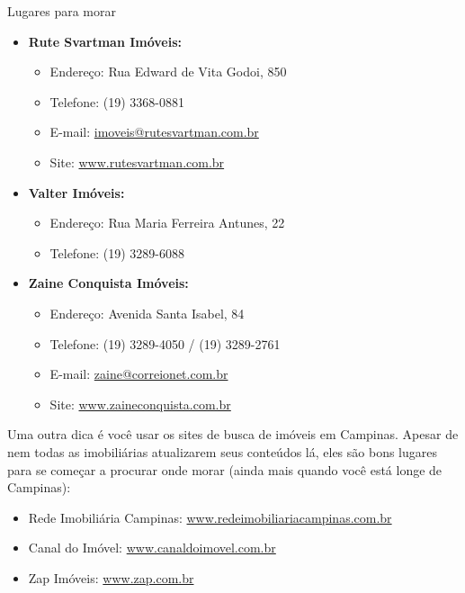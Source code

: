 \begin{story}{Lugares para morar}
\begin{itemize}
\item \textbf{Rute Svartman Imóveis:}
\begin{itemize}
\item Endereço: Rua Edward de Vita Godoi, 850
\item Telefone: (19) 3368-0881
\item E-mail: \url{imoveis@rutesvartman.com.br}
\item Site: \url{www.rutesvartman.com.br}
\end{itemize}

\item \textbf{Valter Imóveis:}
\begin{itemize}
\item Endereço: Rua Maria Ferreira Antunes, 22
\item Telefone: (19) 3289-6088
\end{itemize}

\item \textbf{Zaine Conquista Imóveis:}
\begin{itemize}
\item Endereço: Avenida Santa Isabel, 84
\item Telefone: (19) 3289-4050 / (19) 3289-2761
\item E-mail: \url{zaine@correionet.com.br}
\item Site: \url{www.zaineconquista.com.br}
\end{itemize}

\end{itemize}

Uma outra dica é você usar os sites de busca de imóveis em Campinas. Apesar de nem todas as imobiliárias atualizarem seus conteúdos lá, eles são bons lugares para se começar a procurar onde morar (ainda mais quando você está longe de Campinas):

\begin{itemize}
\item Rede Imobiliária Campinas: \url{www.redeimobiliariacampinas.com.br}
\item Canal do Imóvel: \url{www.canaldoimovel.com.br}
\item Zap Imóveis: \url{www.zap.com.br}
\end{itemize}

\end{story}